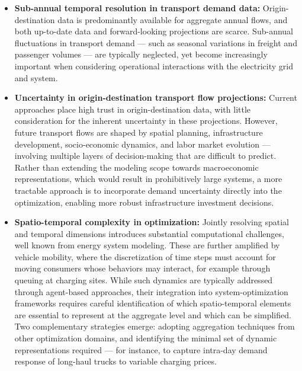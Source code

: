 \begin{itemize}
    \item \textbf{Sub-annual temporal resolution in transport demand data:} Origin-destination data is predominantly available for aggregate annual flows, and both up-to-date data and forward-looking projections are scarce. Sub-annual fluctuations in transport demand — such as seasonal variations in freight and passenger volumes — are typically neglected, yet become increasingly important when considering operational interactions with the electricity grid and system.

    \item \textbf{Uncertainty in origin-destination transport flow projections:} Current approaches place high trust in origin-destination data, with little consideration for the inherent uncertainty in these projections. However, future transport flows are shaped by spatial planning, infrastructure development, socio-economic dynamics, and labor market evolution — involving multiple layers of decision-making that are difficult to predict. Rather than extending the modeling scope towards macroeconomic representations, which would result in prohibitively large systems, a more tractable approach is to incorporate demand uncertainty directly into the optimization, enabling more robust infrastructure investment decisions.
    
    \item \textbf{Spatio-temporal complexity in optimization:} Jointly resolving spatial and temporal dimensions introduces substantial computational challenges, well known from energy system modeling. These are further amplified by vehicle mobility, where the discretization of time steps must account for moving consumers whose behaviors may interact, for example through queuing at charging sites. While such dynamics are typically addressed through agent-based approaches, their integration into system-optimization frameworks requires careful identification of which spatio-temporal elements are essential to represent at the aggregate level and which can be simplified. Two complementary strategies emerge: adopting aggregation techniques from other optimization domains, and identifying the minimal set of dynamic representations required — for instance, to capture intra-day demand response of long-haul trucks to variable charging prices. 
\end{itemize}


